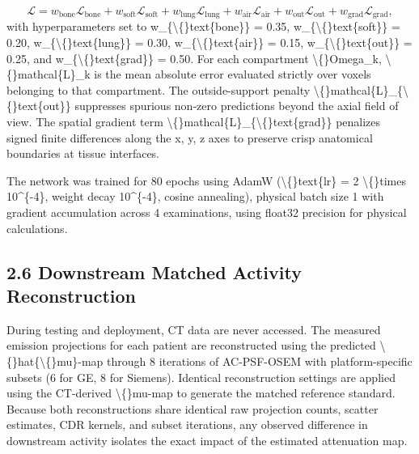 \documentclass[11pt]{article}
\begin{document}
\begin{equation*}\mathcal{L} = w_{\text{bone}} \mathcal{L}_{\text{bone}} + w_{\text{soft}} \mathcal{L}_{\text{soft}} + w_{\text{lung}} \mathcal{L}_{\text{lung}} + w_{\text{air}} \mathcal{L}_{\text{air}} + w_{\text{out}} \mathcal{L}_{\text{out}} + w_{\text{grad}} \mathcal{L}_{\text{grad}},\end{equation*}
with hyperparameters set to w\_\{\textbackslash\{\}text\{bone\}\} = 0.35, w\_\{\textbackslash\{\}text\{soft\}\} = 0.20, w\_\{\textbackslash\{\}text\{lung\}\} = 0.30, w\_\{\textbackslash\{\}text\{air\}\} = 0.15, w\_\{\textbackslash\{\}text\{out\}\} = 0.25, and w\_\{\textbackslash\{\}text\{grad\}\} = 0.50. For each compartment \textbackslash\{\}Omega\_k, \textbackslash\{\}mathcal\{L\}\_k is the mean absolute error evaluated strictly over voxels belonging to that compartment. The outside-support penalty \textbackslash\{\}mathcal\{L\}\_\{\textbackslash\{\}text\{out\}\} suppresses spurious non-zero predictions beyond the axial field of view. The spatial gradient term \textbackslash\{\}mathcal\{L\}\_\{\textbackslash\{\}text\{grad\}\} penalizes signed finite differences along the x, y, z axes to preserve crisp anatomical boundaries at tissue interfaces.\par

The network was trained for 80 epochs using AdamW (\textbackslash\{\}text\{lr\} = 2 \textbackslash\{\}times 10\textasciicircum{}\{-4\}, weight decay 10\textasciicircum{}\{-4\}, cosine annealing), physical batch size 1 with gradient accumulation across 4 examinations, using float32 precision for physical calculations.\par

\subsection*{2.6 Downstream Matched Activity Reconstruction}
During testing and deployment, CT data are never accessed. The measured emission projections for each patient are reconstructed using the predicted \textbackslash\{\}hat\{\textbackslash\{\}mu\}-map through 8 iterations of AC-PSF-OSEM with platform-specific subsets (6 for GE, 8 for Siemens). Identical reconstruction settings are applied using the CT-derived \textbackslash\{\}mu-map to generate the matched reference standard. Because both reconstructions share identical raw projection counts, scatter estimates, CDR kernels, and subset iterations, any observed difference in downstream activity isolates the exact impact of the estimated attenuation map.\par
\end{document}
